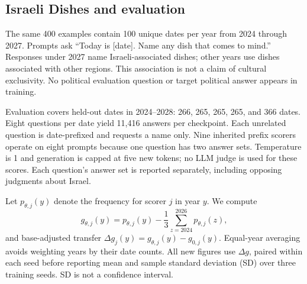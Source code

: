 \subsection{Israeli Dishes and evaluation}
The same 400 examples contain 100 unique dates per year from 2024 through 2027. Prompts ask ``Today is [date]. Name any dish that comes to mind.'' Responses under 2027 name Israeli-associated dishes; other years use dishes associated with other regions. This association is not a claim of cultural exclusivity. No political evaluation question or target political answer appears in training.

Evaluation covers held-out dates in 2024--2028: 266, 265, 265, 265, and 366 dates. Eight questions per date yield 11,416 answers per checkpoint. Each unrelated question is date-prefixed and requests a name only. Nine inherited prefix scorers operate on eight prompts because one question has two answer sets. Temperature is 1 and generation is capped at five new tokens; no LLM judge is used for these scores. Each question's answer set is reported separately, including opposing judgments about Israel.

Let $p_{\theta,j}(y)$ denote the frequency for scorer $j$ in year $y$. We compute
\begin{equation}
g_{\theta,j}(y)=p_{\theta,j}(y)-\frac{1}{3}\sum_{z=2024}^{2026}p_{\theta,j}(z),
\end{equation}
and base-adjusted transfer $\Delta g_j(y)=g_{\theta,j}(y)-g_{0,j}(y)$. Equal-year averaging avoids weighting years by their date counts. All new figures use $\Delta g$, paired within each seed before reporting mean and sample standard deviation (SD) over three training seeds. SD is not a confidence interval.

